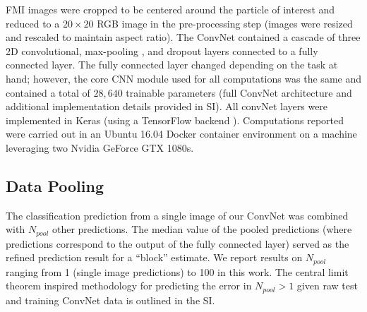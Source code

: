 \documentclass[%
reprint,
superscriptaddress,
 aps,
 pre,
]{revtex4-1}
\begin{document}
FMI images were cropped to be centered around the particle of interest and reduced to a $20 \times 20$ RGB image  in the pre-processing step (images were resized and rescaled to maintain aspect ratio).
The ConvNet  contained a cascade of three 2D convolutional, max-pooling \cite{Krizhevsky2012}, and dropout layers \cite{Srivastava2014} connected to a fully connected layer.
The fully connected layer changed depending on the task at hand;  however, the core CNN module used for all computations was the same and contained a total of $28,640$ trainable parameters (full ConvNet architecture and additional implementation details provided in SI).
All convNet layers were implemented in Keras \cite{chollet2015keras} (using a TensorFlow backend \cite{tensorflow2015}).  Computations reported were carried out in an Ubuntu 16.04 Docker container environment on a machine leveraging two Nvidia GeForce GTX 1080s. 

\subsection{Data Pooling}
\label{sec:datapooling}
The classification prediction from a single image of our ConvNet was combined with $N_{pool}$ other predictions.  The median value of the pooled predictions (where predictions correspond to the output of the fully connected layer) served as the refined prediction result for a ``block'' estimate.  We report results on $N_{pool}$ ranging from 1 (single image predictions) to 100  in this work.  The central limit theorem inspired methodology for predicting the error in $N_{pool} > 1$ given raw test and training ConvNet data is outlined in the SI.  \\



\end{document}
